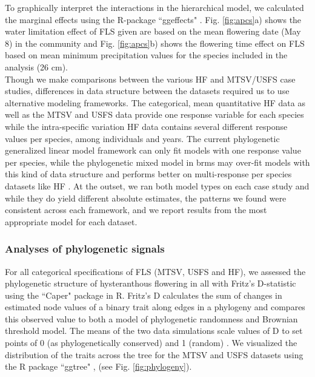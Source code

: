 \documentclass[11pt]{article}
\begin{document}
{%
\indent To graphically interpret the interactions in the hierarchical model, we calculated the marginal effects using the R-package ``ggeffects" \citep{Ludecke2018}. Fig. \ref{fig:apcs}a) shows the water limitation effect of FLS given are based on the mean flowering date (May 8) in the community and  Fig. \ref{fig:apcs}b) shows the flowering time effect on FLS based on mean minimum precipitation values for the species included in the analysis (26 cm). \\

\noindent Though we make comparisons between the various HF and MTSV/USFS case studies, differences in data structure between the datasets required us to use alternative modeling frameworks. The categorical, mean quantitative HF data as well as the MTSV and USFS data provide one response variable for each species while the intra-specific variation HF data contains several different response values per species, among individuals and years. The current phylogenetic generalized linear model framework can only fit models with one response value per species, while the phylogenetic mixed model in brms may over-fit models with this kind of data structure and performs better on multi-response per species datasets like HF \citep{BurknerPC}. At the outset, we ran both model types on each case study and while they do yield different absolute estimates, the patterns we found were consistent across each framework, and we report results from the most appropriate model for each dataset.\\

\subsubsection*{Analyses of phylogenetic signals}
\noindent For all categorical specifications of FLS (MTSV, USFS and HF), we assessed the phylogenetic structure of hysteranthous flowering in all  with Fritz's D-statistic \citep{FRITZ2010} using the ``Caper" package \citep{Orme2013} in R. Fritz's D calculates the sum of changes in estimated node values of a binary trait along edges in a phylogeny and compares this observed value to both a model of phylogenetic randomness and Brownian threshold model. The means of the two data simulations scale values of D to set points of 0 (as phylogenetically conserved) and 1 (random)  \citep{Orme2013}. We visualized the distribution of the traits across the tree for the MTSV and USFS datasets using the R package ``ggtree" \citep{Yu2017}, (see Fig. \ref{fig:phylogeny}). \\

}
\end{document}

